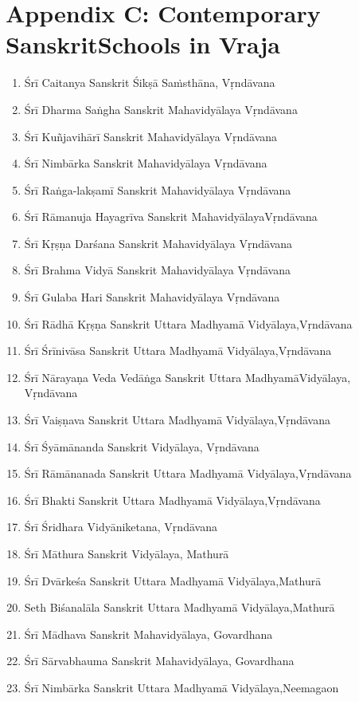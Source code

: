 \section*{Appendix C: Contemporary Sanskrit\hfill\break Schools in Vraja}
\begin{enumerate}
\itemsep=0pt
\item Śrī Caitanya Sanskrit Śikṣā Saṁsthāna, Vṛndāvana 
\item Śrī Dharma Saṅgha Sanskrit Mahavidyālaya Vṛndāvana 
\item Śrī Kuñjavihārī Sanskrit Mahavidyālaya Vṛndāvana 
\item Śrī Nimbārka Sanskrit Mahavidyālaya Vṛndāvana 
\item Śrī Raṅga-lakṣamī Sanskrit Mahavidyālaya Vṛndāvana 
\item Śrī Rāmanuja Hayagrīva Sanskrit Mahavidyālaya\hfil\break Vṛndāvana 
\item Śrī Kṛṣṇa Darśana Sanskrit Mahavidyālaya Vṛndāvana 
\item Śrī Brahma Vidyā Sanskrit Mahavidyālaya Vṛndāvana 
\item Śrī Gulaba Hari Sanskrit Mahavidyālaya Vṛndāvana 
\item Śrī Rādhā Kṛṣṇa Sanskrit Uttara Madhyamā Vidyālaya,\hfil\break Vṛndāvana 
\item Śrī Śrīnivāsa Sanskrit Uttara Madhyamā Vidyālaya,\hfil\break Vṛndāvana 
\item Śrī Nārayaṇa Veda Vedāṅga Sanskrit Uttara Madhyamā\hfil\break Vidyālaya, Vṛndāvana 
\item Śrī Vaiṣṇava Sanskrit Uttara Madhyamā Vidyālaya,\hfil\break Vṛndāvana 
\item Śrī Śyāmānanda Sanskrit Vidyālaya, Vṛndāvana 
\item Śrī Rāmānanada Sanskrit Uttara Madhyamā Vidyālaya,\hfil\break Vṛndāvana 
\item Śrī Bhakti Sanskrit Uttara Madhyamā Vidyālaya,\hfil\break Vṛndāvana 
\item Śrī Śridhara Vidyāniketana, Vṛndāvana 
\item Śrī Māthura Sanskrit Vidyālaya, Mathurā 
\item Śrī Dvārkeśa Sanskrit Uttara Madhyamā Vidyālaya,\hfil\break Mathurā 
\item Seth Biśanalāla Sanskrit Uttara Madhyamā Vidyālaya,\hfil\break Mathurā 
\item Śrī Mādhava Sanskrit Mahavidyālaya, Govardhana 
\item Śrī Sārvabhauma Sanskrit Mahavidyālaya, Govardhana 
\item Śrī Nimbārka Sanskrit Uttara Madhyamā Vidyālaya,\hfil\break Neemagaon 

\end{enumerate}
